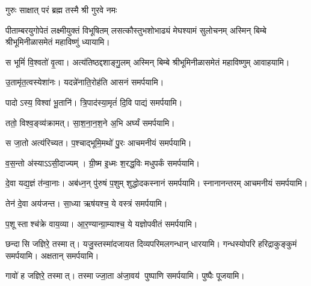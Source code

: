 {गुरुः साक्षात् परं ब्रह्म तस्मै श्री गुरवे नमः}

\begin{center}

{पीताम्बरयुगोपेतं लक्ष्मीयुक्तं विभूषितम्}
{लसत्कौस्तुभशोभाढ्यं मेघश्यामं सुलोचनम्}
अस्मिन् बिम्बे श्रीभूमिनीळासमेतं महाविष्णुं ध्यायामि।
\medskip

{स भूमिं॑ वि॒श्वतो॑ वृ॒त्वा। अत्य॑तिष्ठद्दशाङ्गु॒लम्}
अस्मिन् बिम्बे श्रीभूमिनीळासमेतं महाविष्णुम् आवाहयामि।
\medskip

 {उ॒तामृ॑त॒त्वस्येशा॑नः। यदन्ने॑नाति॒रोह॑ति}
 आसनं समर्पयामि।\medskip

{पादोऽस्य॒ विश्वा॑ भू॒तानि॑। त्रि॒पाद॑स्या॒मृतं॑ दि॒वि}
 पाद्यं समर्पयामि।\medskip
 
{ततो॒ विश्व॒ङ्व्य॑क्रामत्। सा॒श॒ना॒न॒श॒ने अ॒भि}
 अर्घ्यं समर्पयामि।\medskip

{स जा॒तो अत्य॑रिच्यत। प॒श्चाद्भूमि॒मथो॑ पु॒रः}
 आचमनीयं समर्पयामि।\medskip

{व॒स॒न्तो अ॑स्याऽऽसी॒दाज्यम्। ग्री॒ष्म इ॒ध्मः श॒रद्ध॒विः}
मधुपर्कं समर्पयामि।\medskip

 {दे॒वा यद्य॒ज्ञं त॑न्वा॒नाः। अब॑ध्न॒न् पु॑रुषं प॒शुम्}
 शुद्धोदकस्नानं समर्पयामि। स्नानानन्तरम् आचमनीयं समर्पयामि।\medskip

 {तेन॑ दे॒वा अय॑जन्त। सा॒ध्या ऋष॑यश्च॒ ये}
 वस्त्रं समर्पयामि।\medskip

{प॒शूस्ताश्च॑क्रे वाय॒व्या\sn{}। आ॒र॒ण्यान्ग्रा॒म्याश्च॒ ये}
 यज्ञोपवीतं समर्पयामि।\medskip

{छन्दासि जज्ञिरे॒ तस्मात्। यजु॒स्तस्मा॑दजायत}
 दिव्यपरिमलगन्धान् धारयामि। गन्धस्योपरि हरिद्राकुङ्कुमं समर्पयामि। अक्षतान् समर्पयामि।\medskip

{गावो॑ ह जज्ञिरे॒ तस्मात्। तस्माज्जा॒ता अ॑जा॒वय॑}
 पुष्पाणि समर्पयामि।  पुष्पैः पूजयामि।


\end{center}
